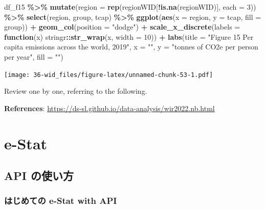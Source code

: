\documentclass[
  xelatex, ja=standard]{bxjsbook}
\newenvironment{Shaded}{\begin{snugshade}}{\end{snugshade}}
\newcommand{\AttributeTok}[1]{\textcolor[rgb]{0.13,0.29,0.53}{#1}}
\newcommand{\ControlFlowTok}[1]{\textcolor[rgb]{0.13,0.29,0.53}{\textbf{#1}}}
\newcommand{\DecValTok}[1]{\textcolor[rgb]{0.00,0.00,0.81}{#1}}
\newcommand{\FunctionTok}[1]{\textcolor[rgb]{0.13,0.29,0.53}{\textbf{#1}}}
\newcommand{\NormalTok}[1]{#1}
\newcommand{\SpecialCharTok}[1]{\textcolor[rgb]{0.81,0.36,0.00}{\textbf{#1}}}
\newcommand{\StringTok}[1]{\textcolor[rgb]{0.31,0.60,0.02}{#1}}
\theoremstyle{definition}
\theoremstyle{definition}
\theoremstyle{definition}
\theoremstyle{definition}
\theoremstyle{remark}
\begin{document}
\begin{Shaded}
\begin{Highlighting}[]
\NormalTok{df\_f15 }\SpecialCharTok{\%\textgreater{}\%} \FunctionTok{mutate}\NormalTok{(}\AttributeTok{region =} \FunctionTok{rep}\NormalTok{(regionWID[}\SpecialCharTok{!}\FunctionTok{is.na}\NormalTok{(regionWID)], }\AttributeTok{each =} \DecValTok{3}\NormalTok{)) }\SpecialCharTok{\%\textgreater{}\%}
  \FunctionTok{select}\NormalTok{(region, group, tcap) }\SpecialCharTok{\%\textgreater{}\%}
  \FunctionTok{ggplot}\NormalTok{(}\FunctionTok{aes}\NormalTok{(}\AttributeTok{x =}\NormalTok{ region, }\AttributeTok{y =}\NormalTok{ tcap, }\AttributeTok{fill =}\NormalTok{ group)) }\SpecialCharTok{+}
  \FunctionTok{geom\_col}\NormalTok{(}\AttributeTok{position =} \StringTok{"dodge"}\NormalTok{) }\SpecialCharTok{+} 
  \FunctionTok{scale\_x\_discrete}\NormalTok{(}\AttributeTok{labels =} \ControlFlowTok{function}\NormalTok{(x) stringr}\SpecialCharTok{::}\FunctionTok{str\_wrap}\NormalTok{(x, }\AttributeTok{width =} \DecValTok{10}\NormalTok{)) }\SpecialCharTok{+}
  \FunctionTok{labs}\NormalTok{(}\AttributeTok{title =} \StringTok{"Figure 15 Per capita emissions across the world, 2019"}\NormalTok{, }
       \AttributeTok{x =} \StringTok{""}\NormalTok{, }\AttributeTok{y =} \StringTok{"tonnes of CO2e per person per year"}\NormalTok{, }\AttributeTok{fill =} \StringTok{""}\NormalTok{)}
\end{Highlighting}
\end{Shaded}

\texttt{[image: 36-wid\_files/figure-latex/unnamed-chunk-53-1.pdf]}

Review one by one, referring to the following.

\textbf{References}: \url{https://ds-sl.github.io/data-analysis/wir2022.nb.html}

\hypertarget{estat}{%
\chapter{e-Stat}\label{estat}}

\hypertarget{api-ux306eux4f7fux3044ux65b9}{%
\section{API の使い方}\label{api-ux306eux4f7fux3044ux65b9}}

\hypertarget{ux306fux3058ux3081ux3066ux306e-e-stat-with-api}{%
\subsection{はじめての e-Stat with API}\label{ux306fux3058ux3081ux3066ux306e-e-stat-with-api}}
\end{document}
